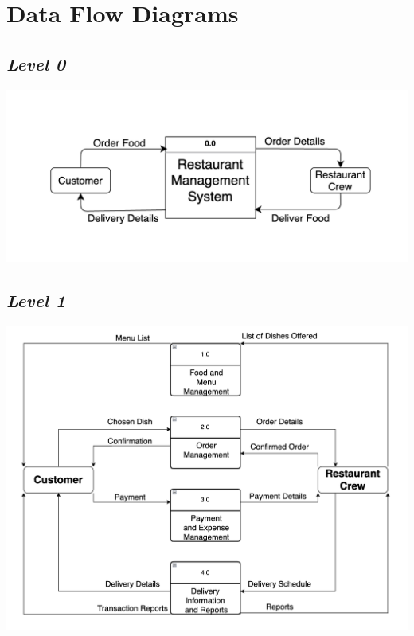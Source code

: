 \documentclass{article}
\begin{document}
\section{\textbf{Data Flow Diagrams}}

\subsection{\textbf{\textit{Level 0}}}
\begin{center}
		\includegraphics[scale=0.7]{level0}
\end{center}
	
\subsection{\textbf{\textit{Level 1}}}
\begin{center}
		\includegraphics[scale=0.6]{level1.png}
\end{center}
\end{document}
